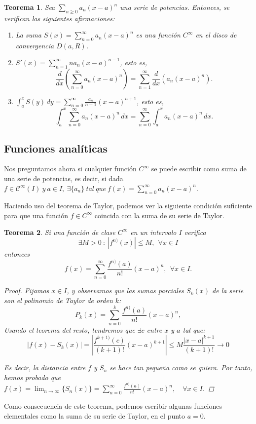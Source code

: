 \documentclass[11pt, a4paper]{article}
\theoremstyle{theorem-style}
\newtheorem{nth}{Teorema}[section]
\theoremstyle{definition-style}
\theoremstyle{remark-style}
\theoremstyle{example-style}
\newenvironment{nlist}
{\begin{enumerate}
\renewcommand\labelenumi{(\emph{\roman{enumi})}}}
{\end{enumerate}}
\begin{document}
\begin{nth}
Sea $\displaystyle\sum_{n\geq 0} a_n (x-a)^n$ una serie de potencias. Entonces, se verifican las siguientes afirmaciones:	
\begin{nlist}
	\item La suma $S(x)=\displaystyle\sum_{n= 0}^\infty a_n (x-a)^n$ es una función $C^\infty$ en el disco de convergencia $D(a,R)$.
\item $S'(x)= \displaystyle\sum_{n= 1}^\infty n a_n (x-a)^{n-1}$, esto es,
\[
\displaystyle\frac{d}{dx} \left( \sum_{n= 0}^\infty a_n (x-a)^n \right) =  \sum_{n= 1}^\infty \frac{d}{dx} \left( a_n (x-a)^n \right) .
\]
\item 
$\displaystyle \int_a^x S(y)\, dy =   \sum_{n= 0}^\infty \frac{a_n}{n+1} (x-a)^{n+1}$, esto es,
\[
\int_a^x  \sum_{n= 0}^\infty a_n (x-a)^n \, dx 
=  \sum_{n= 0}^\infty \int_a^x a_n (x-a)^n \, dx.
\]
\end{nlist}

\end{nth}


\subsection{Funciones analíticas}

Nos preguntamos ahora si cualquier función $C^{\infty}$ se puede escribir como suma de una serie de potencias, es decir, si dada $f \in \mathcal{C}^{\infty}(I)\ y\ a \in I, \ \exists \{a_n\}\ tal\ que\ f(x) = \sum_{n=0}^{\infty}a_n(x-a)^n$.


Haciendo uso del teorema de Taylor, podemos ver la siguiente condici\'on suficiente para que una funci\'on $f\in C^\infty$ coincida con la suma de su serie de Taylor.

\begin{nth}
Si una funci\'on de clase $C^\infty$ en un intervalo $I$ verifica 
\[
\exists M>0 \ : \  |f^{n)}(x)|\leq M, \ \ \forall x\in I
\]
entonces 
\[
f(x) = \sum_{n=0}^\infty \frac{f^{n)} (a)}{n!} (x-a)^n , \ \ \forall x\in I.
\]

\begin{proof}
	Fijamos $x \in I$, y observamos que las sumas parciales $S_k(x)$ de la serie son el polinomio de Taylor de orden $k$: 
\[
P_k(x) =  \sum_{n=0}^k \frac{f^{n)} (a)}{n!} (x-a)^n,
\]
Usando el teorema del resto, tendremos que $\exists c$ entre $x$ y $a$ tal que:
\[
|f(x)-S_k(x)| =\left| \frac{ f^{k+1)} (c)}{(k+1)!} (x-a)^{k+1}\right| \leq  M \frac{|x-a|^{k+1}}{(k+1)!} \to 0
\]

Es decir, la distancia entre $f$ y $S_n$ se hace tan pequeña como se quiera. Por tanto, hemos probado que $\displaystyle f(x) = \lim_{n \to \infty} \{S_n(x)\} = \sum_{n=0}^{\infty} \frac{f^{n)} (a)}{n!} (x-a)^n, \quad \forall x \in I$.
\end{proof}
\end{nth}
Como consecuencia de este teorema, podemos escribir algunas funciones elementales como la suma de su serie de Taylor, en el punto $a = 0$.
\end{document}
